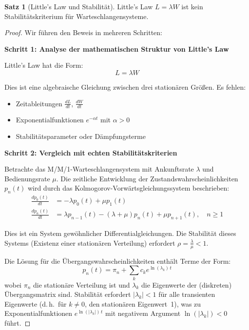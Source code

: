 ﻿\documentclass[a4paper,12pt]{report}
\theoremstyle{definition}
\newtheorem{satz}{Satz}[section]
\begin{document}
\begin{satz}[Little's Law und Stabilität]
	Little's Law $L = \lambda W$ ist kein Stabilitätskriterium für Warteschlangensysteme.
\end{satz}

\begin{proof}
	Wir führen den Beweis in mehreren Schritten:
	
	\textbf{Schritt 1: Analyse der mathematischen Struktur von Little's Law}
	
	Little's Law hat die Form:
	\begin{equation}
		L = \lambda W
	\end{equation}
	
	Dies ist eine algebraische Gleichung zwischen drei stationären Größen. Es fehlen:
	\begin{itemize}
		\item[-] Zeitableitungen $\frac{dL}{dt}$, $\frac{dW}{dt}$
		\item[-] Exponentialfunktionen $e^{-\alpha t}$ mit $\alpha > 0$
		\item[-] Stabilitätsparameter oder Dämpfungsterme
	\end{itemize}
	
	\textbf{Schritt 2: Vergleich mit echten Stabilitätskriterien}
	
	Betrachte das M/M/1-Warteschlangensystem mit Ankunftsrate $\lambda$ und Bedienungsrate $\mu$. Die zeitliche Entwicklung der Zustandswahrscheinlichkeiten $p_n(t)$ wird durch das Kolmogorov-Vorwärtsgleichungssystem beschrieben:
	\begin{align}
		\frac{dp_0(t)}{dt} &= -\lambda p_0(t) + \mu p_1(t) \\
		\frac{dp_n(t)}{dt} &= \lambda p_{n-1}(t) - (\lambda + \mu) p_n(t) + \mu p_{n+1}(t), \quad n \geq 1
	\end{align}
	
	Dies ist ein System gewöhnlicher Differentialgleichungen. Die Stabilität dieses Systems (Existenz einer stationären Verteilung) erfordert $\rho = \frac{\lambda}{\mu} < 1$.
	
	Die Lösung für die Übergangswahrscheinlichkeiten enthält Terme der Form:
	\begin{equation}
		p_n(t) = \pi_n + \sum_{k} c_k e^{\ln(\lambda_k)\,t}
	\end{equation}
	wobei $\pi_n$ die stationäre Verteilung ist und $\lambda_k$ die Eigenwerte
	der (diskreten) Übergangsmatrix sind.  Stabilität erfordert $|\lambda_k| < 1$
	für alle transienten Eigenwerte (d.\,h.\ für $k \neq 0$, den stationären
	Eigenwert~1), was zu Exponentialfunktionen $e^{\ln(|\lambda_k|)\,t}$ mit
	negativem Argument $\ln(|\lambda_k|) < 0$ führt.
	

\end{proof}
\end{document}

